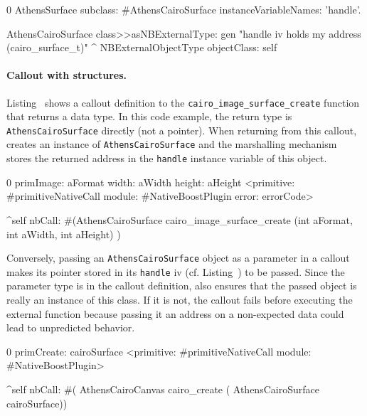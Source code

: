 \begin{stcode}[
	label={lst:AthensCairoSurface},
	caption={Example of C structure wrapping in \NB}]{0}
AthensSurface subclass: #AthensCairoSurface
	instanceVariableNames: 'handle'.

AthensCairoSurface class>>asNBExternalType: gen
	"handle iv holds my address (cairo_surface_t)"
	^ NBExternalObjectType objectClass: self
\end{stcode}

\paragraph{Callout with structures.}
Listing~ shows a callout definition to the \texttt{cairo\_image\_surface\_create} function that returns a  data type.
In this code example, the return type is \texttt{AthensCairoSurface} directly (not a pointer).
When returning from this callout, \NB creates an instance of \texttt{AthensCairoSurface} and the marshalling mechanism  stores the returned address in the \texttt{handle} instance variable of this object.

\begin{stcode}[
	label={lst:calloutOpaqueStruct},
	caption={Example of returning a structure by reference}]{0}
primImage: aFormat width: aWidth height: aHeight
	<primitive: #primitiveNativeCall
	 module: #NativeBoostPlugin
     error: errorCode>

	^self nbCall: #(AthensCairoSurface
		cairo_image_surface_create (int aFormat,
									int aWidth,
									int aHeight) )
\end{stcode}

Conversely, passing an \texttt{AthensCairoSurface} object as a parameter in a callout makes its pointer stored in its \texttt{handle} iv (cf. Listing~) to be passed.
Since the parameter type is  in the callout definition, \NB also ensures that the passed object is really an instance of this class.
If it is not, the callout fails before executing the external function because passing it an address on a non-expected data could lead to unpredicted behavior.

\begin{stcode}[
	label={lst:calloutOpaqueStructParameter},
	caption={Example of passing a structure by reference}]{0}
primCreate: cairoSurface
	<primitive: #primitiveNativeCall
	 module: #NativeBoostPlugin>

	^self nbCall: #(
        AthensCairoCanvas cairo_create (
                  AthensCairoSurface cairoSurface))
\end{stcode}


